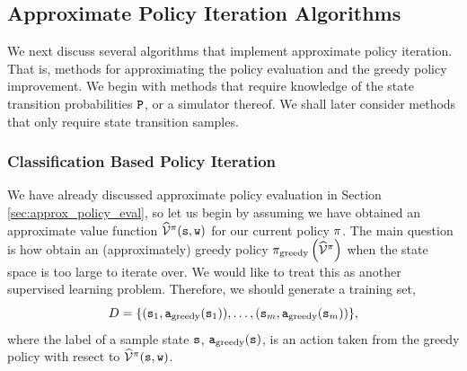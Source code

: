 \subsection{Approximate Policy Iteration Algorithms}

We next discuss several algorithms that implement approximate policy iteration. That is, methods for approximating the policy evaluation and the greedy policy improvement. We begin with methods that require knowledge of the state transition probabilities ${\tt P}$, or a simulator thereof. We shall later consider methods that only require state transition samples.

\subsubsection{Classification Based Policy Iteration}
We have already discussed approximate policy evaluation in Section \ref{sec:approx_policy_eval}, so let us begin by assuming we have obtained an approximate value function $\widehat{\mathcal{V}}^{\pi}({\tt s},{\tt w})$ for our current policy $\pi$. The main question is how obtain an (approximately) greedy policy $\pi_{\textrm{greedy}}\left(\widehat{\mathcal{V}}^\pi\right)$ when the state space is too large to iterate over. We would like to treat this as another supervised learning problem. Therefore, we should
generate a training set, 
\[
D = \{({\tt s}_1, {\tt a}_{\textrm{greedy}}({\tt s}_1)),\ldots,
({\tt s}_m,{\tt a}_{\textrm{greedy}}({\tt s}_m))\},
\]
where the label of a sample state ${\tt s}$, ${\tt a}_{\textrm{greedy}}({\tt s})$, is an action taken from the greedy policy with resect to $\widehat{\mathcal{V}}^{\pi}({\tt s},{\tt w})$.

